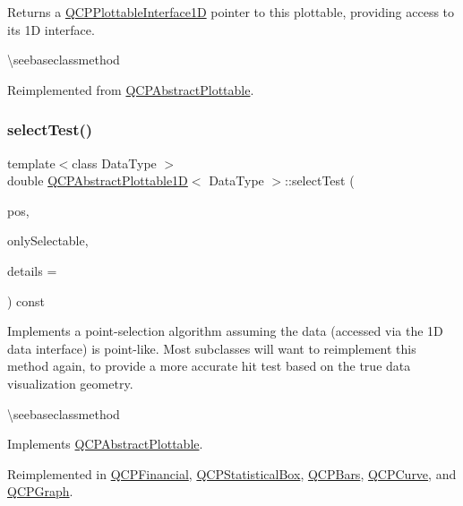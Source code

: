 Returns a \mbox{\hyperlink{class_q_c_p_plottable_interface1_d}{Q\+C\+P\+Plottable\+Interface1D}} pointer to this plottable, providing access to its 1D interface.

\textbackslash{}seebaseclassmethod 

Reimplemented from \mbox{\hyperlink{class_q_c_p_abstract_plottable_a81fd9fd5c4f429c074785e2eb238a8e7}{Q\+C\+P\+Abstract\+Plottable}}.

\mbox{\label{class_q_c_p_abstract_plottable1_d_a4611b43bcb6441b2154eb4f4e0a33db2}} 
\subsubsection{\texorpdfstring{selectTest()}{selectTest()}}
{\footnotesize\ttfamily template$<$class Data\+Type $>$ \\
double \mbox{\hyperlink{class_q_c_p_abstract_plottable1_d}{Q\+C\+P\+Abstract\+Plottable1D}}$<$ Data\+Type $>$\+::select\+Test (\begin{DoxyParamCaption}\item[{const Q\+PointF \&}]{pos,  }\item[{bool}]{only\+Selectable,  }\item[{Q\+Variant $\ast$}]{details = {} }\end{DoxyParamCaption}) const\hspace{0.3cm}{\ttfamily [virtual]}}

Implements a point-\/selection algorithm assuming the data (accessed via the 1D data interface) is point-\/like. Most subclasses will want to reimplement this method again, to provide a more accurate hit test based on the true data visualization geometry.

\textbackslash{}seebaseclassmethod 

Implements \mbox{\hyperlink{class_q_c_p_abstract_plottable_addb3f5c41f007a78c3e142cc605bc712}{Q\+C\+P\+Abstract\+Plottable}}.



Reimplemented in \mbox{\hyperlink{class_q_c_p_financial_aac8e91622ac58330fa9ce81cc8fd40ee}{Q\+C\+P\+Financial}}, \mbox{\hyperlink{class_q_c_p_statistical_box_a1607fa92f829c631107c20ccb2d70a6d}{Q\+C\+P\+Statistical\+Box}}, \mbox{\hyperlink{class_q_c_p_bars_a121f899c27af3186fe93dcd0eb98f49b}{Q\+C\+P\+Bars}}, \mbox{\hyperlink{class_q_c_p_curve_a0ed9b7e6b4bc72010d6fcd974af46a8b}{Q\+C\+P\+Curve}}, and \mbox{\hyperlink{class_q_c_p_graph_a6d669d04462d272c6aa0e5f85846d673}{Q\+C\+P\+Graph}}.

